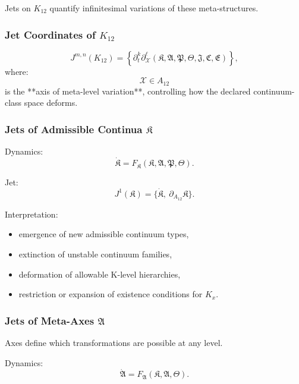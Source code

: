 Jets on $K_{12}$ quantify infinitesimal variations of these meta-structures.


\subsubsection{Jet Coordinates of $K_{12}$}

\[
J^{m,n}(K_{12}) =
\left\{
\partial_t^k \partial_{\mathcal{X}}^\ell
(\mathfrak{K},\mathfrak{A},\mathfrak{P},\mathfrak{\Theta},\mathfrak{J},\mathfrak{C},\mathfrak{E})
\right\},
\]
where:
\[
\mathcal{X} \in A_{12}
\]
is the **axis of meta-level variation**, controlling how the declared continuum-class space deforms.


\subsubsection{Jets of Admissible Continua $\mathfrak{K}$}

Dynamics:
\[
\dot{\mathfrak{K}}
=
F_{\mathfrak{K}}(\mathfrak{K},\mathfrak{A},\mathfrak{P},\mathfrak{\Theta}).
\]

Jet:
\[
J^1(\mathfrak{K})
= \{\dot{\mathfrak{K}},\ \partial_{A_{12}}\mathfrak{K}\}.
\]

Interpretation:
\begin{itemize}
    \item emergence of new admissible continuum types,
    \item extinction of unstable continuum families,
    \item deformation of allowable K-level hierarchies,
    \item restriction or expansion of existence conditions for $K_x$.
\end{itemize}


\subsubsection{Jets of Meta-Axes $\mathfrak{A}$}

Axes define which transformations are possible at any level.

Dynamics:
\[
\dot{\mathfrak{A}}
=
F_{\mathfrak{A}}(\mathfrak{K},\mathfrak{A},\mathfrak{\Theta}).
\]

